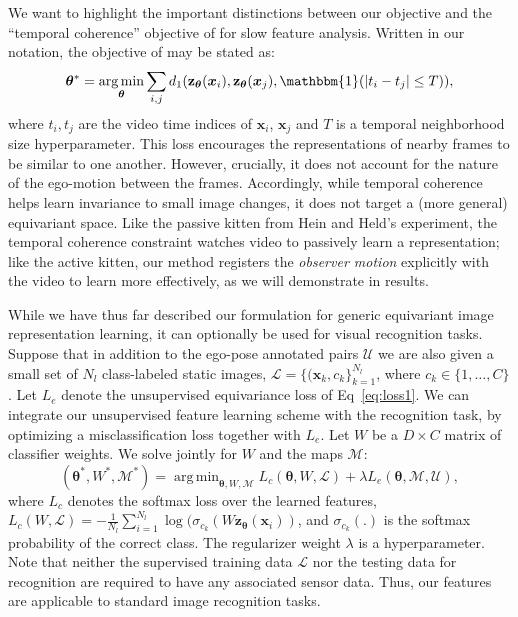\documentclass[10pt,twocolumn,letterpaper]{article}
\DeclareMathOperator*{\argmin}{arg\,min}
\newcommand{\cc}{}
\newcommand{\newchanges}{}
\newcommand{\changes}{}
\begin{document}
We want to highlight the important distinctions between our objective and the ``temporal coherence'' objective of \cite{Mobahi2009}\cc{for slow feature analysis}.   Written in our notation, the objective of \cite{Mobahi2009} may be stated as:
\vspace{-0.05in}\begin{equation}
%
  \bm{\theta}^* = \argmin_{\bm{\theta}} \sum_{i,j} d_{1}(\mathbf{z}_{\bm{\theta}}(\bm{x}_i),\mathbf{z}_{\bm{\theta}}(\bm{x}_j), \mathbbm{1}(|t_i-t_j|\leq T)),
%
  \label{eq:temp_coherence}
\end{equation}
where $t_i, t_j$ are the video time indices of $\bm{x}_i$, $\bm{x}_j$ and $T$ is a temporal neighborhood size hyperparameter.  This loss encourages the representations of nearby frames to be similar to one another.  However, crucially, it does not account for the nature of the ego-motion between the frames.  Accordingly, while temporal coherence helps learn invariance to small image changes, it does not target a (more general) equivariant space.  Like the passive kitten from Hein and Held's experiment, the temporal coherence constraint watches video to passively learn a representation; like the active kitten, our method registers the \emph{observer motion} explicitly with the video to learn more effectively, as we will demonstrate in results.

While we have thus far described our formulation for generic equivariant image representation learning, it can optionally be used for visual recognition tasks.
Suppose that in addition to the ego-pose annotated pairs $\mathcal{U}$ we are also given a small set of $N_l$ class-labeled \newchanges{static} images, $\mathcal{L} = \{(\bm{x}_k,c_k\}_{k=1}^{N_l}$, where $c_k \in \{1,\dots,C\}$.
Let $L_e$ denote the unsupervised equivariance loss of Eq~\eqref{eq:loss1}. We can integrate our unsupervised feature learning scheme with the recognition task, by optimizing a misclassification loss together with $L_e$.
Let $W$ be a $D \times C$ matrix of classifier weights. {We solve jointly for $W$ and the maps $\mathcal{M}$}:
\begin{equation}
  (\bm{\theta}^*,W^*,\mathcal{M}^*)=\argmin_{\bm{\theta},W,\mathcal{M}} L_{c}(\changes{\bm{\theta}}, W,\mathcal{L})  + \lambda L_{e}(\bm{\theta}, \mathcal{M},\mathcal{U}),
  \label{eq:recog}
\end{equation}
where $L_c$ denotes the softmax loss over the learned features, $L_c(W,\mathcal{L}) = -\frac{1}{N_l} \sum_{i=1}^{N_l} \log(\sigma_{c_k}(W\mathbf{z}_{\bm{\theta}}(\bm{x}_i))$, and $\sigma_{c_k}(.)$ is the softmax probability of the correct class.
%
The regularizer weight $\lambda$ is a hyperparameter. \newchanges{Note that neither the supervised training data $\mathcal{L}$ nor the testing data for recognition are required to have any associated sensor data. Thus, our features are applicable to standard image recognition tasks.}%
\end{document}
